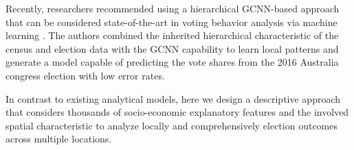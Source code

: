 \documentclass[runningheads]{llncs}
\begin{document}
Recently, researchers recommended using a hierarchical GCNN-based approach that can be considered state-of-the-art in voting behavior analysis via machine learning \cite{li2019deep}. The authors combined the inherited hierarchical characteristic of the census and election data with the GCNN capability to learn local patterns and generate a model capable of predicting the vote shares from the 2016 Australia congress election with low error rates.


In contrast to existing analytical models, here we design a descriptive approach that considers thousands of socio-economic explanatory features and the involved spatial characteristic to analyze locally and comprehensively election outcomes across multiple locations.

\end{document}
